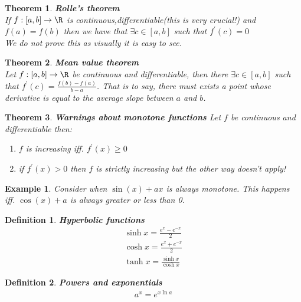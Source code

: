 \documentclass[titlepage]{article}
\newtheorem{theorem}{Theorem}[section]
\newtheorem{definition}{Definition}
\newtheorem{example}{Example}[section]
\begin{document}
\begin{theorem} \textbf{Rolle's theorem}
\\
If $f:[a,b] \to \R$ is continuous,differentiable(this is very crucial!) and $f(a) = f(b)$ then we have that $\exists c \in [a,b]$ such that $f^{\prime}(c) = 0$ 
\\

We do not prove this as visually it is easy to see. 
\end{theorem}

\begin{theorem}
\textbf{Mean value theorem}
\\
Let $f:[a,b] \to \R$ be continuous and differentiable, then there $\exists c \in [a,b]$ such that $f^{\prime}(c) = \frac{f(b)-f(a)}{b-a}$. That is to say, there must exists a point whose derivative is equal to the average slope between $a$ and $b$. 
\end{theorem}

\begin{theorem}\textbf{Warnings about monotone functions}
Let $f$ be continuous and differentiable then:
\begin{enumerate}
    \item $f$ is increasing iff. $f^{\prime}(x) \geq 0$
    \item if $f^{\prime}(x) > 0$ then $f$ is strictly increasing but the other way doesn't apply! 
\end{enumerate}
\end{theorem}


\begin{example}
Consider when $\sin(x) + ax$ is always monotone. This happens iff. $\cos(x) + a$ is always greater or less than 0.
\end{example}

\begin{definition}\textbf{Hyperbolic functions}
\begin{align*}
    \sinh{x} = \frac{e^{x} - e^{-x}}{2}\\
    \cosh{x} = \frac{e^{x} + e^{-x}}{2}\\
    \tanh{x} = \frac{\sinh{x}}{\cosh{x}}
\end{align*}
\end{definition}

\begin{definition}\textbf{Powers and exponentials}
\begin{align*}
    a^{x} = e^{x\ln{a}}\\
\end{align*}
\end{definition}
\end{document}
